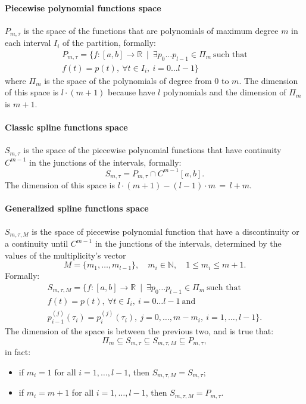 \documentclass[a4paper]{article}
\newcommand{\mR}{\ensuremath{\mathbb{R}}}
\newcommand{\mN}{\ensuremath{\mathbb{N}}}
\begin{document}
\paragraph{Piecewise polynomial functions space} $P_{m,\tau}$
is the space of the functions that are polynomials of maximum degree $m$
in each interval $I_i$ of the partition, formally:
\begin{multline*}
  P_{m,\tau}=\{f:[a,b]\rightarrow\mR\ \mid\ \exists p_0\dots
  p_{l-1}\in\Pi_m \ \text{such that}\\
  f(t)=p(t),\ \forall t\in I_i,\
  i=0\dots l-1\}
\end{multline*}
where $\Pi_m$ is the space of the polynomials of degree from $0$ to
$m$. The dimension of this space is $l\cdot(m+1)$ because have $l$
polynomials and the dimension of $\Pi_m$ is $m+1$.
\paragraph{Classic spline functions space} $S_{m,\tau}$ is the space of
the piecewise polynomial functions that have continuity $C^{m-1}$ in
the junctions of the intervals, formally:
$$
S_{m,\tau}=P_{m,\tau}\cap C^{m-1}[a,b].
$$
The dimension of this space is $l\cdot(m+1)-(l-1)\cdot m\,=\,l+m$.
\paragraph{Generalized spline functions space} $S_{m,\tau,M}$ is the
space of piecewise polynomial function that have a discontinuity or a
continuity until $C^{m-1}$ in the junctions of the intervals,
determined by the values of the multiplicity's
vector
$$
M=\{m_1,\dots,m_{l-1}\},\quad m_i\in\mN,\quad 1\leq m_i\leq m+1.
$$
Formally:
\begin{multline*}
  S_{m,\tau,M}=\{f:[a,b]\rightarrow\mR\ \mid\ \exists p_0\dots
  p_{l-1}\in\Pi_m \ \text{such that}\\
  f(t)=p(t),\ \forall t\in I_i,\
  i=0\dots l-1\ \text{and}\\
  p_{i-1}^{(j)}(\tau_i)=p_{i}^{(j)}(\tau_i),\ j=0,\dots,m-m_i,\ i=1,\dots,l-1\}.
\end{multline*}
The dimension of the space is between the previous two, and is true
that:
$$
\Pi_m\subseteq S_{m,\tau}\subseteq S_{m,\tau,M}\subseteq P_{m,\tau},
$$
in fact:
\begin{itemize}
  \item if $m_i=1$ for all $i=1,\dots,l-1$, then
    $S_{m,\tau,M}=S_{m,\tau}$;
  \item if $m_i=m+1$ for all $i=1,\dots,l-1$, then
    $S_{m,\tau,M}=P_{m,\tau}$.
\end{itemize}
\end{document}
